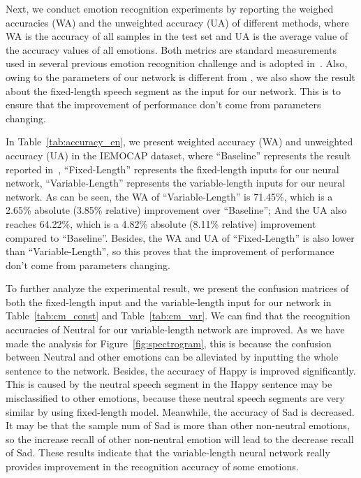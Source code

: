 \documentclass[a4paper]{article}
\begin{document}
Next, we conduct emotion recognition experiments by reporting the weighed accuracies (WA) and the unweighted accuracy (UA) of different methods, where WA is the accuracy of all samples in the test set and UA is the average value of the accuracy values of all emotions. Both metrics are standard measurements used in several previous emotion recognition challenge and is adopted in~\cite{satt2017}. Also, owing to the parameters of our network is different from \cite{satt2017}, we also show the result about the fixed-length speech segment as the input for our network. This is to ensure that the improvement of performance don't come from parameters changing.

In Table~\ref{tab:accuracy_en}, we present weighted accuracy (WA) and unweighted accuracy (UA) in the IEMOCAP dataset, where ``Baseline'' represents the result reported in~\cite{satt2017}, ``Fixed-Length'' represents the fixed-length inputs for our neural network, ``Variable-Length'' represents the variable-length inputs for our neural network. As can be seen, the WA of ``Variable-Length'' is 71.45\%, which is a 2.65\% absolute (3.85\% relative) improvement over ``Baseline''; And the UA also reaches 64.22\%, which is a 4.82\% absolute (8.11\% relative) improvement compared to ``Baseline''. Besides, the WA and UA of ``Fixed-Length'' is also lower than ``Variable-Length'', so this proves that the improvement of performance don't come from parameters changing.

To further analyze the experimental result, we present the confusion matrices of both the fixed-length input and the variable-length input for our network in Table~\ref{tab:cm_const} and Table~\ref{tab:cm_var}. We can find that the recognition accuracies of Neutral for our variable-length network are improved. As we have made the analysis for Figure~\ref{fig:spectrogram}, this is because the confusion between Neutral and other emotions can be alleviated by inputting the whole sentence to the network. Besides, the accuracy of Happy is improved significantly. This is caused by the neutral speech segment in the Happy sentence may be misclassified to other emotions, because these neutral speech segments are very similar by using fixed-length model. Meanwhile, the accuracy of Sad is decreased. It may be that the sample num of Sad is more than other non-neutral emotions, so the increase recall of other non-neutral emotion will lead to the decrease recall of Sad. These results indicate that the variable-length neural network really provides improvement in the recognition accuracy of some emotions.
\end{document}
